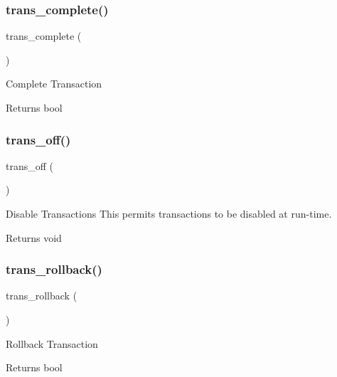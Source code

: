 \subsubsection{\texorpdfstring{trans\+\_\+complete()}{trans\_complete()}}
{\footnotesize\ttfamily trans\+\_\+complete (\begin{DoxyParamCaption}{ }\end{DoxyParamCaption})}

Complete Transaction

\begin{DoxyReturn}{Returns}
bool 
\end{DoxyReturn}
\mbox{\label{class_c_i___d_b__driver_ae9080ca6b0a9a258f5e87750b266e337}} 
\subsubsection{\texorpdfstring{trans\+\_\+off()}{trans\_off()}}
{\footnotesize\ttfamily trans\+\_\+off (\begin{DoxyParamCaption}{ }\end{DoxyParamCaption})}

Disable Transactions This permits transactions to be disabled at run-\/time.

\begin{DoxyReturn}{Returns}
void 
\end{DoxyReturn}
\mbox{\label{class_c_i___d_b__driver_a53f76d4dfcd6ac04fb653982442aeef8}} 
\subsubsection{\texorpdfstring{trans\+\_\+rollback()}{trans\_rollback()}}
{\footnotesize\ttfamily trans\+\_\+rollback (\begin{DoxyParamCaption}{ }\end{DoxyParamCaption})}

Rollback Transaction

\begin{DoxyReturn}{Returns}
bool 
\end{DoxyReturn}
\mbox{\label{class_c_i___d_b__driver_ab082d21c9a77398c6d6705d9e978fb20}} 
